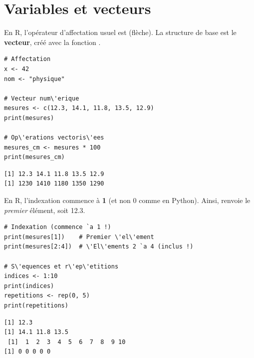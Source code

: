 \section{Variables et vecteurs}

En R, l'op\'erateur d'affectation usuel est \ri{<-} (fl\`eche). La structure de base
est le \textbf{vecteur}, cr\'e\'e avec la fonction .

\begin{codeblock}[title=\textbf{R}]
\begin{verbatim}
# Affectation
x <- 42
nom <- "physique"

# Vecteur num\'erique
mesures <- c(12.3, 14.1, 11.8, 13.5, 12.9)
print(mesures)

# Op\'erations vectoris\'ees
mesures_cm <- mesures * 100
print(mesures_cm)
\end{verbatim}
\end{codeblock}

\begin{codeoutput}
\begin{verbatim}
[1] 12.3 14.1 11.8 13.5 12.9
[1] 1230 1410 1180 1350 1290
\end{verbatim}
\end{codeoutput}

\begin{attention}
En R, l'indexation commence \`a \textbf{1} (et non 0 comme en Python).
Ainsi,  renvoie le \emph{premier} \'el\'ement, soit 12.3.
\end{attention}

\begin{codeblock}[title=\textbf{R}]
\begin{verbatim}
# Indexation (commence `a 1 !)
print(mesures[1])    # Premier \'el\'ement
print(mesures[2:4])  # \'El\'ements 2 `a 4 (inclus !)

# S\'equences et r\'ep\'etitions
indices <- 1:10
print(indices)
repetitions <- rep(0, 5)
print(repetitions)
\end{verbatim}
\end{codeblock}

\begin{codeoutput}
\begin{verbatim}
[1] 12.3
[1] 14.1 11.8 13.5
 [1]  1  2  3  4  5  6  7  8  9 10
[1] 0 0 0 0 0
\end{verbatim}
\end{codeoutput}


